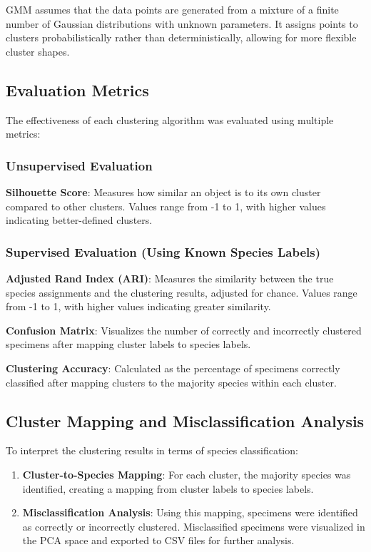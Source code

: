 \documentclass[a4paper,12pt]{report}
\begin{document}
GMM assumes that the data points are generated from a mixture of a finite number of Gaussian distributions with unknown parameters. It assigns points to clusters probabilistically rather than deterministically, allowing for more flexible cluster shapes.

\subsection{Evaluation Metrics}

The effectiveness of each clustering algorithm was evaluated using multiple metrics:

\subsubsection{Unsupervised Evaluation}

\textbf{Silhouette Score}: Measures how similar an object is to its own cluster compared to other clusters. Values range from -1 to 1, with higher values indicating better-defined clusters.

\subsubsection{Supervised Evaluation (Using Known Species Labels)}

\textbf{Adjusted Rand Index (ARI)}: Measures the similarity between the true species assignments and the clustering results, adjusted for chance. Values range from -1 to 1, with higher values indicating greater similarity.

\textbf{Confusion Matrix}: Visualizes the number of correctly and incorrectly clustered specimens after mapping cluster labels to species labels.

\textbf{Clustering Accuracy}: Calculated as the percentage of specimens correctly classified after mapping clusters to the majority species within each cluster.

\subsection{Cluster Mapping and Misclassification Analysis}

To interpret the clustering results in terms of species classification:

\begin{enumerate}
    \item \textbf{Cluster-to-Species Mapping}: For each cluster, the majority species was identified, creating a mapping from cluster labels to species labels.
    \item \textbf{Misclassification Analysis}: Using this mapping, specimens were identified as correctly or incorrectly clustered. Misclassified specimens were visualized in the PCA space and exported to CSV files for further analysis.
\end{enumerate}
\end{document}
